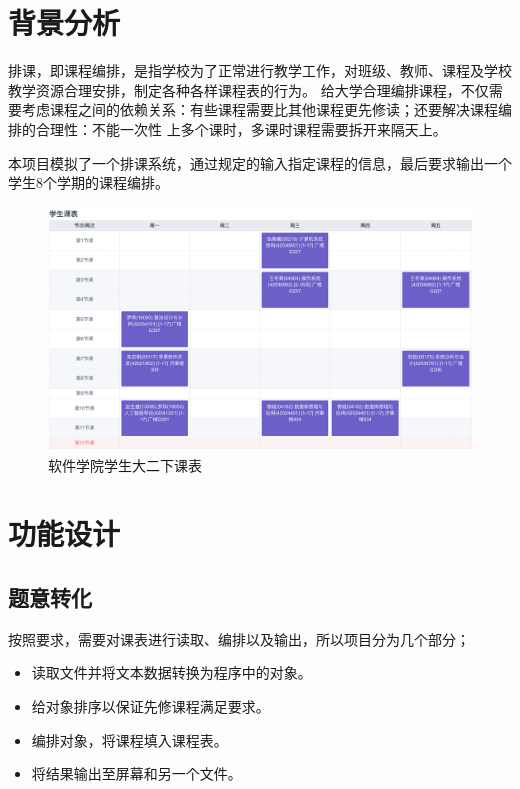 
\chapter{背景分析}

排课，即课程编排，是指学校为了正常进行教学工作，对班级、教师、课程及学校教学资源合理安排，制定各种各样课程表的行为。%
给大学合理编排课程，不仅需要考虑课程之间的依赖关系：有些课程需要比其他课程更先修读；还要解决课程编排的合理性：不能一次性%
上多个课时，多课时课程需要拆开来隔天上。

本项目模拟了一个排课系统，通过规定的输入指定课程的信息，最后要求输出一个学生8个学期的课程编排。

\begin{figure}[H]
    \centering
    \includegraphics[width=12cm]{src/course.png}
    \caption{软件学院学生大二下课表}
\end{figure}


\chapter{功能设计}

\section{题意转化}

按照要求，需要对课表进行读取、编排以及输出，所以项目分为几个部分；

\begin{itemize}
    \item 读取文件并将文本数据转换为程序中的对象。
    \item 给对象排序以保证先修课程满足要求。
    \item 编排对象，将课程填入课程表。
    \item 将结果输出至屏幕和另一个文件。
\end{itemize}

